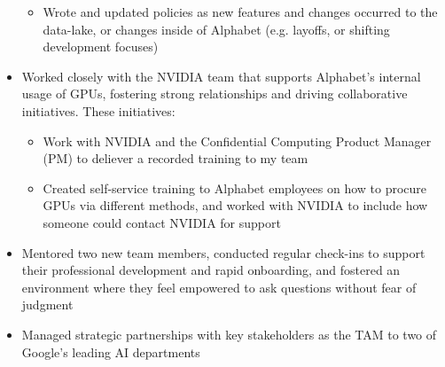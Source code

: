 \begin{itemize}
\begin{itemize}
              \item Wrote and updated policies as new features and changes occurred to the data-lake, or changes inside of Alphabet (e.g. layoffs, or shifting development focuses)

          \end{itemize}

    \item Worked closely with the NVIDIA team that supports Alphabet's internal usage of GPUs, fostering strong relationships and driving collaborative initiatives. These initiatives:

          \begin{itemize}

              \item Work with NVIDIA and the Confidential Computing Product Manager (PM) to deliever a recorded training to my team

              \item Created self-service training to Alphabet employees on how to procure GPUs via different methods, and worked with NVIDIA to include how someone could contact NVIDIA for support

          \end{itemize}

    \item Mentored two new team members, conducted regular check-ins to support their professional development and rapid onboarding, and fostered an environment where they feel empowered to ask questions without fear of judgment

    \item Managed strategic partnerships with key stakeholders as the TAM to two of Google's leading AI departments

\end{itemize}